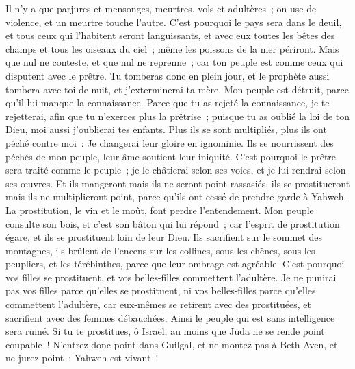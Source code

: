 \begin{multicols}{2}
Il n'y a que parjures et mensonges, meurtres, vols et adultères~; on use de violence, et un meurtre touche l'autre.
C'est pourquoi le pays sera dans le deuil, et tous ceux qui l'habitent seront languissants, et avec eux toutes les bêtes des champs et tous les oiseaux du ciel~; même les poissons de la mer périront.
Mais que nul ne conteste, et que nul ne reprenne~; car ton peuple est comme ceux qui disputent avec le prêtre.
Tu tomberas donc en plein jour, et le prophète aussi tombera avec toi de nuit, et j'exterminerai ta mère.
Mon peuple est détruit, parce qu'il lui manque la connaissance. Parce que tu as rejeté la connaissance, je te rejetterai, afin que tu n'exerces plus la prêtrise~; puisque tu as oublié la loi de ton Dieu, moi aussi j'oublierai tes enfants.
Plus ils se sont multipliés, plus ils ont péché contre moi~: Je changerai leur gloire en ignominie.
Ils se nourrissent des péchés de mon peuple, leur âme soutient leur iniquité.
C'est pourquoi le prêtre sera traité comme le peuple~; je le châtierai selon ses voies, et je lui rendrai selon ses œuvres.
Et ils mangeront mais ils ne seront point rassasiés, ils se prostitueront mais ils ne multiplieront point, parce qu'ils ont cessé de prendre garde à Yahweh.
La prostitution, le vin et le moût, font perdre l'entendement.
Mon peuple consulte son bois, et c'est son bâton qui lui répond~; car l'esprit de prostitution égare, et ils se prostituent loin de leur Dieu.
Ils sacrifient sur le sommet des montagnes, ils brûlent de l'encens sur les collines, sous les chênes, sous les peupliers, et les térébinthes, parce que leur ombrage est agréable. C'est pourquoi vos filles se prostituent, et vos belles-filles commettent l'adultère.
Je ne punirai pas vos filles parce qu'elles se prostituent, ni vos belles-filles parce qu'elles commettent l'adultère, car eux-mêmes se retirent avec des prostituées, et sacrifient avec des femmes débauchées. Ainsi le peuple qui est sans intelligence sera ruiné.
Si tu te prostitues, ô Israël, au moins que Juda ne se rende point coupable~! N'entrez donc point dans Guilgal, et ne montez pas à Beth-Aven, et ne jurez point~: Yahweh est vivant~!

\end{multicols}
